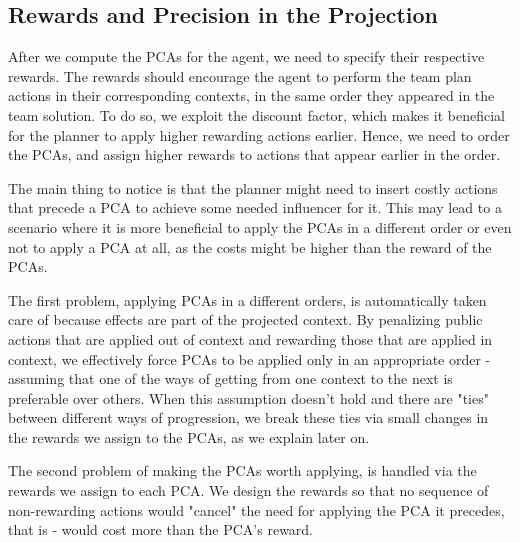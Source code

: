 \documentclass[letterpaper]{article} %
\theoremstyle{definition}
\newcommand{\eliran}[1]{\textbf{[\color{red}ELIRAN:#1]}}
\newcommand{\ronen}[1]{\textbf{[\color{blue}RONEN:#1]}}
\begin{document}
\subsection{Rewards and Precision in the Projection}

After we compute the PCAs for the agent, we need to specify their respective rewards. The rewards should encourage the agent to perform the team plan actions in their corresponding contexts, in the same order they appeared in the team solution. 
To do so, we exploit the discount factor, which makes it beneficial for the planner to apply higher rewarding actions earlier. Hence, we need to order the PCAs, and assign higher rewards to actions that appear earlier in the order.

The main thing to notice is that the planner might need to insert costly actions that precede a PCA to achieve some needed influencer for it. This may lead to a scenario where it is more beneficial to apply the PCAs in a different order or even not to apply a PCA at all, as the costs might be higher than the reward of the PCAs.

The first problem, applying PCAs in a different orders, is automatically taken care of because effects are part of the
projected context. 
By penalizing public actions that are applied out of context and rewarding those that are applied in context, we effectively force PCAs to be applied only in an appropriate order - assuming that one of the ways of getting from one context to the next is preferable over others. When this assumption doesn't hold and there are "ties" between different ways of progression, we break these ties via small changes in the rewards we assign to the PCAs, as we explain later on.

The second problem of making the PCAs worth applying, is handled via the rewards we assign to each PCA. 
%
We design the rewards so that no sequence of non-rewarding actions would "cancel" the need for applying the PCA it precedes, that is - would cost more than the PCA's reward.
\end{document}
